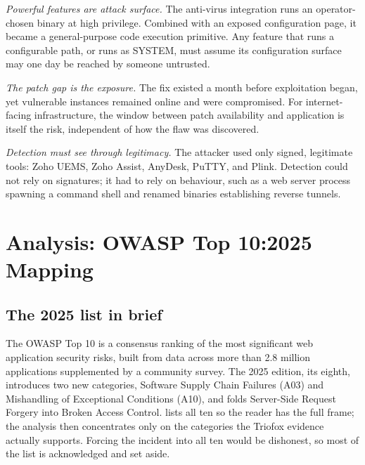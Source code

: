 \documentclass[11pt,a4paper]{article}
\newcommand{\code}[1]{{\small\ttfamily #1}}
\begin{document}
\textit{Powerful features are attack surface.} The anti-virus integration runs an operator-chosen binary at high privilege. Combined with an exposed configuration page, it became a general-purpose code execution primitive. Any feature that runs a configurable path, or runs as \code{SYSTEM}, must assume its configuration surface may one day be reached by someone untrusted.

\textit{The patch gap is the exposure.} The fix existed a month before exploitation began, yet vulnerable instances remained online and were compromised. For internet-facing infrastructure, the window between patch availability and application is itself the risk, independent of how the flaw was discovered.

\textit{Detection must see through legitimacy.} The attacker used only signed, legitimate tools: Zoho UEMS, Zoho Assist, AnyDesk, PuTTY, and Plink. Detection could not rely on signatures; it had to rely on behaviour, such as a web server process spawning a command shell and renamed binaries establishing reverse tunnels.

\section{Analysis: OWASP Top 10:2025 Mapping}

\subsection{The 2025 list in brief}

The OWASP Top 10 is a consensus ranking of the most significant web application security risks, built from data across more than 2.8 million applications supplemented by a community survey. The 2025 edition, its eighth, introduces two new categories, Software Supply Chain Failures (A03) and Mishandling of Exceptional Conditions (A10), and folds Server-Side Request Forgery into Broken Access Control.  lists all ten so the reader has the full frame; the analysis then concentrates only on the categories the Triofox evidence actually supports. Forcing the incident into all ten would be dishonest, so most of the list is acknowledged and set aside.
\end{document}

